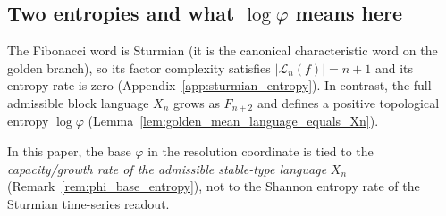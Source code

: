 \subsection{Two entropies and what \texorpdfstring{$\log\varphi$}{log phi} means here}
\label{app:two_entropies}
The Fibonacci word is Sturmian (it is the canonical characteristic word on
the golden branch), so its factor complexity satisfies
$|\mathcal{L}_n(f)|=n+1$ and its entropy rate is zero
(Appendix~\ref{app:sturmian_entropy}).
In contrast, the full admissible block language $X_n$ grows as $F_{n+2}$ and
defines a positive topological entropy $\log\varphi$
(Lemma~\ref{lem:golden_mean_language_equals_Xn}).
\par
\noindent
In this paper, the base $\varphi$ in the resolution coordinate is tied to the
\emph{capacity/growth rate of the admissible stable-type language} $X_n$
(Remark~\ref{rem:phi_base_entropy}), not to the Shannon entropy rate of the
Sturmian time-series readout.


